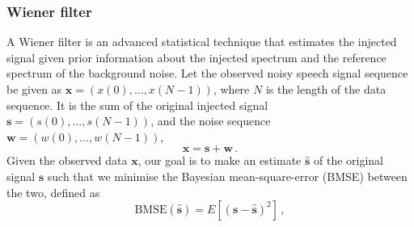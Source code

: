 \documentclass[paper-main.tex]{subfiles}
\begin{document}
\subsubsection{Wiener filter}
\label{sec:Wiener}

A Wiener filter is an advanced statistical technique that estimates the injected signal given prior information about the injected spectrum and the reference spectrum of the background noise. Let the observed noisy speech signal sequence be given as $\mathbf{x}=(x(0),\dots, x(N-1))$, where $N$ is the length of the data sequence. It is the sum of the original injected signal $\mathbf{s}=(s(0),\dots,s(N-1))$, and the noise sequence $\mathbf{w}=(w(0),\dots,w(N-1))$, 
\begin{equation}
    \mathbf{x}=\mathbf{s}+\mathbf{w}\,.
\end{equation}
Given the observed data $\textbf{x}$, our goal is to make an estimate $\hat{\textbf{s}}$ of the original signal $\textbf{s}$ such that we minimise the Bayesian mean-square-error (BMSE) between the two, defined as 
\begin{equation}
\label{eq:BMSE}
\text{BMSE}(\hat{\textbf{s}})=E[(\textbf{s}-\hat{\textbf{s}})^2]\,,
\end{equation}
\end{document}
